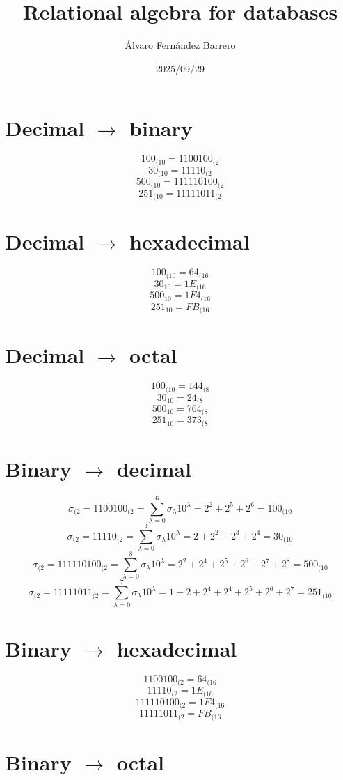 \documentclass[12pt]{article}
\title{Relational algebra for databases}
\author{Álvaro Fernández Barrero}
\date{2025/09/29}
\begin{document}
\maketitle

\section{Decimal \(\to\) binary}

\[
	100_{(10} = 1100100_{(2}
\]
\[
	30_{(10} = 11110_{(2}
\]
\[
	500_{(10} = 111110100_{(2}
\]
\[
	251_{(10} = 11111011_{(2}
\]

\section{Decimal \(\to\) hexadecimal}

\[
	100_{(10} = 64_{(16}
\]
\[
	30_{10} = 1E_{(16}
\]
\[
	500_{10} = 1F4_{(16}
\]
\[
	251_{10} = FB_{(16}
\]

\section{Decimal \(\to\) octal}

\[
	100_{(10} = 144_{(8}
\]
\[
	30_{10} = 24_{(8}
\]
\[
	500_{10} = 764_{(8}
\]
\[
	251_{10} = 373_{(8}
\]

\section{Binary \(\to\) decimal}

\[
	\sigma_{(2} = 1100100_{(2} = \sum_{\lambda=0}^{6}\sigma_{\lambda}10^{\lambda} = 2^2 + 2^5 + 2^6 = 100_{(10}
\]
\[
	\sigma_{(2} = 11110_{(2} = \sum_{\lambda=0}^{4}\sigma_{\lambda}10^{\lambda} = 2 + 2^2 + 2^3 + 2^4 = 30_{(10}
\]
\[
	\sigma_{(2} = 111110100_{(2} = \sum_{\lambda=0}^{8}\sigma_{\lambda}10^{\lambda} = 2^2 + 2^4 + 2^5 + 2^6 + 2^7 + 2^8 = 500_{(10}
\]
\[
	\sigma_{(2} = 11111011_{(2} = \sum_{\lambda=0}^{7}\sigma_{\lambda}10^{\lambda} = 1 + 2 + 2^4 + 2^4 + 2^5 + 2^6 + 2^7 = 251_{(10}
\]

\section{Binary \(\to\) hexadecimal}

\[
	1100100_{(2} = 64_{(16}
\]
\[
	11110_{(2} = 1E_{(16}
\]
\[
	111110100_{(2} = 1F4_{(16}
\]
\[
	11111011_{(2} = FB_{(16}
\]

\section{Binary \(\to\) octal}
\end{document}
